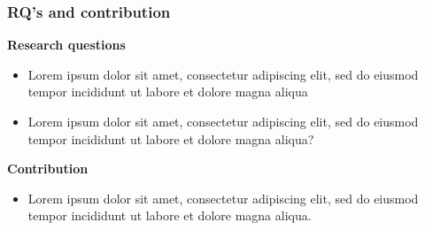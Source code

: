 \documentclass{beamer}
\begin{document}
\begin{frame}
\frametitle{RQ's and contribution}

\textbf{Research questions}
    \begin{itemize}
        \item Lorem ipsum dolor sit amet, consectetur adipiscing elit, sed do eiusmod tempor incididunt ut labore et dolore magna aliqua
        \item Lorem ipsum dolor sit amet, consectetur adipiscing elit, sed do eiusmod tempor incididunt ut labore et dolore magna aliqua? 
    \end{itemize}
\bigskip
\textbf{Contribution}
    \begin{itemize}
        \item[] Lorem ipsum dolor sit amet, consectetur adipiscing elit, sed do eiusmod tempor incididunt ut labore et dolore magna aliqua.
    \end{itemize}

\end{frame}
\end{document}
